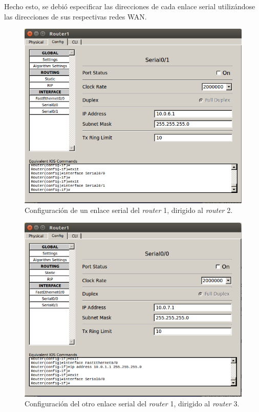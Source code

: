 \documentclass[spanish]{udpreport}
\begin{document}
Hecho esto, se debió especificar las direcciones de cada enlace serial utilizándose las direcciones de sus respectivas redes WAN.

\begin{figure}[H]
	\begin{center}
		\includegraphics[width= 12cm]{Imagenes/serial2}
		\caption{Configuración de un enlace serial del \textit{router} 1, dirigido al \textit{router} 2.}
	\end{center}
\end{figure}

\begin{figure}[H]
	\begin{center}
		\includegraphics[width= 12cm]{Imagenes/serial1}
		\caption{Configuración del otro enlace serial del \textit{router} 1, dirigido al\textit{ router} 3.}
	\end{center}
\end{figure}
\end{document}
